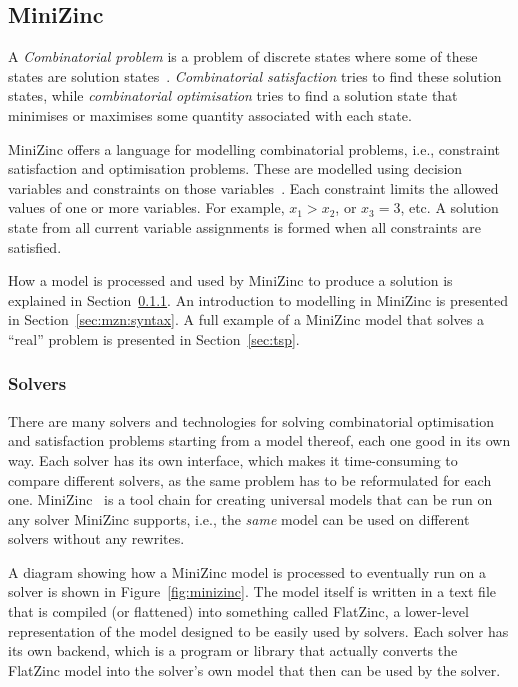 \documentclass[a4paper,12pt]{article}
\begin{document}
\subsection{MiniZinc}\label{sec:mzn}
A \emph{Combinatorial problem} is a problem of discrete states where some of these states are
solution states~\cite{combopt}. \emph{Combinatorial satisfaction} tries to find these solution states,
while \emph{combinatorial optimisation} tries to find a solution state that minimises or
maximises some quantity associated with each state.

MiniZinc offers a language for modelling combinatorial problems, i.e., constraint satisfaction
and optimisation problems. These are modelled using decision variables and
constraints on those variables~\cite{constraintshandbook}. Each constraint limits the
allowed values of one or more variables.
For example, $x_1 > x_2$, or $x_3 = 3$, etc.
A solution state from all current variable assignments is formed when all constraints are
satisfied.

How a model is processed and used by MiniZinc to produce a solution is explained in Section~\ref{sec:mzn:solvers}.
An introduction to modelling in MiniZinc is presented in Section~\ref{sec:mzn:syntax}.
A full example of a MiniZinc model that solves a ``real'' problem is presented in Section~\ref{sec:tsp}.

\subsubsection{Solvers}\label{sec:mzn:solvers}
There are many solvers and technologies for solving combinatorial optimisation and
satisfaction problems starting from a model thereof, each one good in its own way. Each solver
has its own interface, which makes it time-consuming to compare different
solvers, as the same problem has to be reformulated for each one. MiniZinc~\cite{MiniZinc}
is a tool chain for creating universal models that can be run on any solver MiniZinc
supports, i.e., the \emph{same} model can be used on different solvers without any
rewrites.

A diagram showing how a MiniZinc model is processed to eventually run on a
solver is shown in Figure~\ref{fig:minizinc}. The model itself is written in a text file
that is compiled (or flattened) into something called FlatZinc, a lower-level
representation of the model designed to be easily used by solvers. Each
solver has its own backend, which is a program or library that actually converts the
FlatZinc model into the solver's own model that then can be used by the solver.
\end{document}
